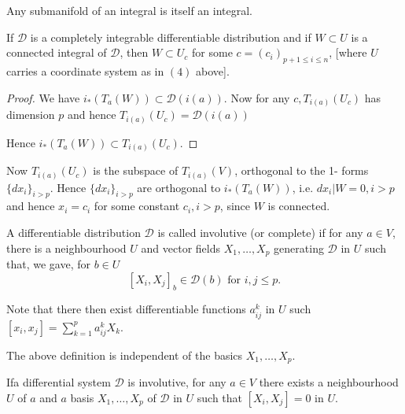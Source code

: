 \begin{remark*}
  Any submanifold of an integral is itself an integral.
\end{remark*}

\setcounter{lemma}{0}
\begin{lemma}\label{chap2:sec6:lem1}
  If $\mathscr{D}$ is a completely integrable differentiable
  distribution and if $W \subset U$ is a connected integral of
  $\mathscr{D}$, then $W \subset U_c$ for some $c = (c_i)_{p+1 \leq i
  \leq n}$, [where $U$ carries a coordinate system as in $(4)$
    above]. 
\end{lemma}

\begin{proof}
  We have $i_* (T_a(W)) \subset \mathscr{D} (i(a))$. Now for any $c,
  T_{i (a)} (U_c)$ has dimension $p$ and hence $T_{i(a)}(U_c) =
  \mathscr{D} (i(a))$ 
  
  Hence \hspace{2cm} $i_* (T_a(W)) \subset T_{i(a)} (U_c)$.  
\end{proof}

Now $T_{i(a)}(U_c)$ is the subspace of $T_{i(a)}(V)$, orthogonal to
the 1- forms $\{dx_i \}_{i > p}$. Hence $\{d x_{i}\}_{i > p}$ are
orthogonal to $i_* (T_a(W))$, i.e. $dx_i | W = 0, i > p$ and hence
$x_i = c_i$ for some constant $c_i, i > p$, since $W$ is connected.

\begin{defi*}
  A differentiable distribution $\mathscr{D}$ is called involutive (or
  complete) if for any $a \in V$, there is a neighbourhood $U$ and
  vector fields $X_1, \ldots , X_p$ generating $\mathscr{D}$ in $U$
  such that, we gave, for $b \in U$ 
  $$
  [X_i, X_j]_b \in \mathscr{D}(b) \text{ for }i,j \leq p.
  $$
\end{defi*}

Note that there then exist differentiable functions $a^k_{ij}$ in $U$
such \break $[x_i, x_j] = \sum \limits^p_{k=1} a^k_{ij} X_k$. 

\begin{remark*}
  The above definition is independent of the basics $X_1, \ldots , X_p$.
\end{remark*}

\begin{lemma}\label{chap2:sec6:lem2}%
  If\pageoriginale a differential system $\mathscr{D}$ is involutive, for any $a \in
  V$ there exists a neighbourhood $U$ of $a$ and $a$ basis $X_1,
  \ldots, X_p$ of $\mathscr{D}$ in $U$ such that $[X_i, X_j]=0$ in
  $U$.  
\end{lemma}

